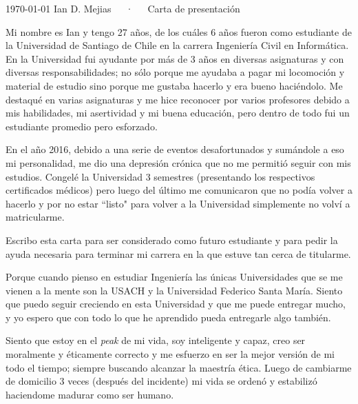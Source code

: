 \documentclass[11pt, spanish, letterpaper]{awesome-cv}
\begin{document}
\makecvheader[C]

\makecvfooter
  {\today}
  {Ian D. Mejias~~~·~~~Carta de presentación}
  {}

\makelettertitle

\begin{cvletter}


Mi nombre es Ian y tengo 27 años, de los cuáles 6 años fueron como estudiante 
  de la Universidad de Santiago de Chile en la carrera Ingeniería Civil en 
  Informática. En la Universidad fui ayudante por más de 3 años en diversas 
  asignaturas y con diversas responsabilidades; no sólo porque me ayudaba a 
  pagar mi locomoción y material de estudio sino porque me gustaba hacerlo y 
  era bueno haciéndolo. Me destaqué en varias asignaturas y me hice reconocer 
  por varios profesores debido a mis habilidades, mi asertividad y mi buena 
  educación, pero dentro de todo fui un estudiante promedio pero esforzado.

  En el año 2016, debido a una serie de eventos desafortunados y sumándole a 
  eso mi personalidad, me dio una depresión crónica que no me permitió seguir 
  con mis estudios. Congelé la Universidad 3 semestres (presentando los 
  respectivos certificados médicos) pero luego del último me comunicaron que 
  no podía volver a hacerlo y por no estar ``listo" para volver a la 
  Universidad simplemente no volví a matricularme.

  Escribo esta carta para ser considerado como futuro estudiante y para pedir 
  la ayuda necesaria para terminar mi carrera en la que estuve tan cerca de 
  titularme.


Porque cuando pienso en estudiar Ingeniería las únicas Universidades que se me 
  vienen a la mente son la USACH y la Universidad Federico Santa María.  
  Siento que puedo seguir creciendo en esta Universidad y que me puede 
  entregar mucho, y yo espero que con todo lo que he aprendido pueda 
  entregarle algo también.


  Siento que estoy en el {\em peak} de mi vida, soy inteligente y capaz, 
  creo ser moralmente y éticamente correcto y me esfuerzo en ser la mejor 
  versión de mi todo el tiempo; siempre buscando alcanzar la maestría ética.  
  Luego de cambiarme de domicilio 3 veces (después del incidente) mi vida se 
  ordenó y estabilizó haciendome madurar como ser humano.

\end{cvletter}


\makeletterclosing
\end{document}
